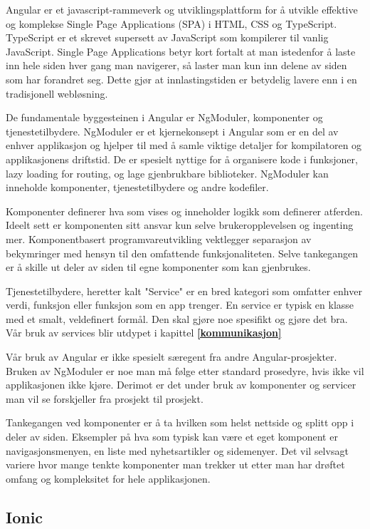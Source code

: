 Angular er et javascript-rammeverk og utviklingsplattform for å utvikle effektive og komplekse Single Page Applications (SPA) i HTML, CSS og TypeScript. TypeScript er et skrevet supersett av JavaScript som kompilerer til vanlig JavaScript. Single Page Applications  betyr kort fortalt at man istedenfor å laste inn hele siden hver gang man navigerer, så laster man kun inn delene av siden som har forandret seg. Dette gjør at innlastingstiden er betydelig lavere enn i en tradisjonell webløsning. 

De fundamentale byggesteinen i Angular er NgModuler, komponenter og tjenestetilbydere. NgModuler er et kjernekonsept i Angular som er en del av enhver applikasjon og hjelper til med å samle viktige detaljer for kompilatoren og applikasjonens driftstid. De er spesielt nyttige for å organisere kode i funksjoner, lazy loading for routing, og lage gjenbrukbare biblioteker. NgModuler kan inneholde komponenter,  tjenestetilbydere og andre kodefiler.

Komponenter definerer hva som vises og inneholder logikk som definerer atferden. Ideelt sett er komponenten sitt ansvar kun selve brukeropplevelsen og ingenting mer. Komponentbasert programvareutvikling vektlegger separasjon av bekymringer med hensyn til den omfattende funksjonaliteten. Selve tankegangen er å skille ut deler av siden til egne komponenter som kan gjenbrukes. 

Tjenestetilbydere, heretter kalt "Service" er en bred kategori som omfatter enhver verdi, funksjon eller funksjon som en app trenger. En service er typisk en klasse med et smalt, veldefinert formål. Den skal gjøre noe spesifikt og gjøre det bra. Vår bruk av services blir utdypet i kapittel \textbf{\ref{kommunikasjon}} 

Vår bruk av Angular er ikke spesielt særegent fra andre Angular-prosjekter. Bruken av NgModuler er noe man må følge etter standard prosedyre, hvis ikke vil applikasjonen ikke kjøre. Derimot er det under bruk av komponenter og servicer man vil se forskjeller fra prosjekt til prosjekt. 


Tankegangen ved komponenter er å ta hvilken som helst nettside og splitt opp i deler av siden. Eksempler på hva som typisk kan være et eget komponent er navigasjonsmenyen, en liste med nyhetsartikler og sidemenyer. Det vil selvsagt variere hvor mange tenkte komponenter man trekker ut etter man har drøftet omfang og kompleksitet for hele applikasjonen.

\subsection{\textbf{Ionic}}

